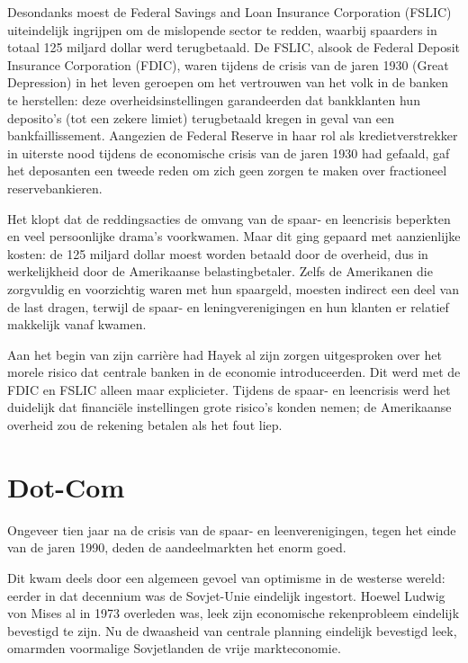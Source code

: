 \documentclass[
  a5paper,
  smalldemyvopaper,11pt,twoside,onecolumn,openright,extrafontsizes]{memoir}
\begin{document}
Desondanks moest de Federal Savings and Loan Insurance Corporation
(FSLIC) uiteindelijk ingrijpen om de mislopende sector te redden,
waarbij spaarders in totaal 125 miljard dollar werd terugbetaald. De
FSLIC, alsook de Federal Deposit Insurance Corporation (FDIC), waren
tijdens de crisis van de jaren 1930 (Great Depression) in het leven
geroepen om het vertrouwen van het volk in de banken te herstellen: deze
overheidsinstellingen garandeerden dat bankklanten hun deposito's (tot
een zekere limiet) terugbetaald kregen in geval van een
bankfaillissement. Aangezien de Federal Reserve in haar rol als
kredietverstrekker in uiterste nood tijdens de economische crisis van de
jaren 1930 had gefaald, gaf het deposanten een tweede reden om zich geen
zorgen te maken over fractioneel reservebankieren.

Het klopt dat de reddingsacties de omvang van de spaar- en leencrisis
beperkten en veel persoonlijke drama's voorkwamen. Maar dit ging gepaard
met aanzienlijke kosten: de 125 miljard dollar moest worden betaald door
de overheid, dus in werkelijkheid door de Amerikaanse belastingbetaler.
Zelfs de Amerikanen die zorgvuldig en voorzichtig waren met hun
spaargeld, moesten indirect een deel van de last dragen, terwijl de
spaar- en leningverenigingen en hun klanten er relatief makkelijk vanaf
kwamen.

Aan het begin van zijn carrière had Hayek al zijn zorgen uitgesproken
over het morele risico dat centrale banken in de economie
introduceerden. Dit werd met de FDIC en FSLIC alleen maar explicieter.
Tijdens de spaar- en leencrisis werd het duidelijk dat financiële
instellingen grote risico's konden nemen; de Amerikaanse overheid zou de
rekening betalen als het fout liep.

\section{Dot-Com}\label{dot-com}

Ongeveer tien jaar na de crisis van de spaar- en leenverenigingen, tegen
het einde van de jaren 1990, deden de aandeelmarkten het enorm goed.

Dit kwam deels door een algemeen gevoel van optimisme in de westerse
wereld: eerder in dat decennium was de Sovjet-Unie eindelijk ingestort.
Hoewel Ludwig von Mises al in 1973 overleden was, leek zijn economische
rekenprobleem eindelijk bevestigd te zijn. Nu de dwaasheid van centrale
planning eindelijk bevestigd leek, omarmden voormalige Sovjetlanden de
vrije markteconomie.
\end{document}
